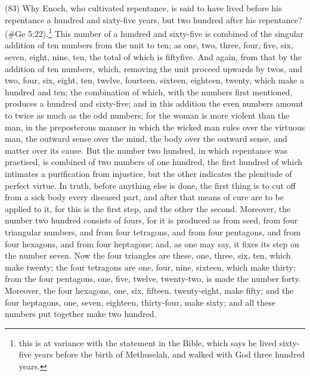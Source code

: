 (83) Why Enoch, who cultivated repentance, is said to have lived before his repentance a hundred
and sixty-five years, but two hundred after his repentance? (\#Ge 5:22).\footnote{this is at variance with
the statement in the Bible, which says he lived sixty-five years before the birth of Methuselah, and walked with God three
hundred years.} This number of a hundred and sixty-five is combined of the singular addition of ten
numbers from the unit to ten; as one, two, three, four, five, six, seven, eight, nine, ten, the total of
which is fiftyfive. And again, from that by the addition of ten numbers, which, removing the unit
proceed upwards by twos, and two, four, six, eight, ten, twelve, fourteen, sixteen, eighteen, twenty,
which make a hundred and ten; the combination of which, with the numbers first mentioned,
produces a hundred and sixty-five; and in this addition the even numbers amount to twice as much
as the odd numbers; for the woman is more violent than the man, in the preposterous manner in
which the wicked man rules over the virtuous man, the outward sense over the mind, the body over
the outward sense, and matter over its cause. But the number two hundred, in which repentance
was practised, is combined of two numbers of one hundred, the first hundred of which intimates a
purification from injustice, but the other indicates the plenitude of perfect virtue. In truth, before
anything else is done, the first thing is to cut off from a sick body every diseased part, and after
that means of cure are to be applied to it, for this is the first step, and the other the second.
Moreover, the number two hundred consists of fours, for it is produced as from seed, from four
triangular numbers, and from four tetragons, and from four pentagons, and from four hexagons,
and from four heptagons; and, as one may say, it fixes its step on the number seven. Now the four
triangles are these, one, three, six, ten, which make twenty; the four tetragons are one, four, nine,
sixteen, which make thirty; from the four pentagons, one, five, twelve, twenty-two, is made the
number forty. Moreover, the four hexagons, one, six, fifteen, twenty-eight, make fifty; and the four
heptagons, one, seven, eighteen, thirty-four, make sixty; and all these numbers put together make
two hundred.

